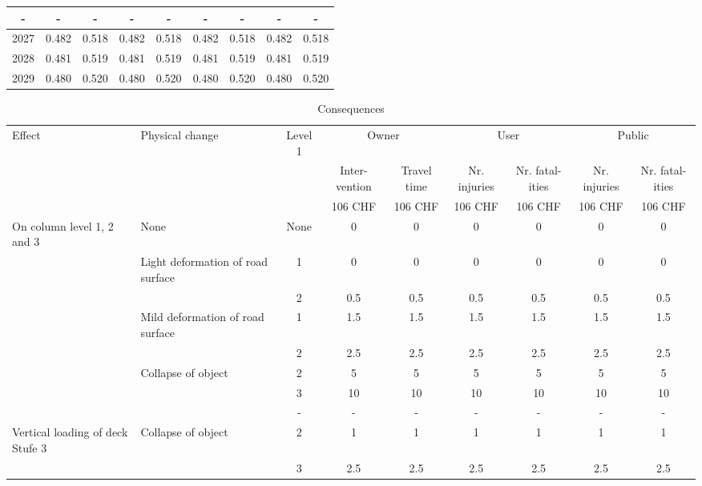 \begin{table}
\begin{tabular}{|l|l|l|l|l|l|l|l|l|}
\multicolumn{1}{|c}{-} & \multicolumn{1}{c}{-} & \multicolumn{1}{c}{-} & \multicolumn{1}{c}{-} & \multicolumn{1}{c}{-} & \multicolumn{1}{c}{-} & \multicolumn{1}{c}{-} & \multicolumn{1}{c}{-} & \multicolumn{1}{c|}{-} \\ 
\hline
\multicolumn{1}{|c|}{2027} & \multicolumn{1}{c|}{0.482} & \multicolumn{1}{c|}{0.518} & \multicolumn{1}{c|}{0.482} & \multicolumn{1}{c|}{0.518} & \multicolumn{1}{c|}{0.482} & \multicolumn{1}{c|}{0.518} & \multicolumn{1}{c|}{0.482} & \multicolumn{1}{c|}{0.518} \\ 
\hline
\multicolumn{1}{|c|}{2028} & \multicolumn{1}{c|}{0.481} & \multicolumn{1}{c|}{0.519} & \multicolumn{1}{c|}{0.481} & \multicolumn{1}{c|}{0.519} & \multicolumn{1}{c|}{0.481} & \multicolumn{1}{c|}{0.519} & \multicolumn{1}{c|}{0.481} & \multicolumn{1}{c|}{0.519} \\ 
\hline
\multicolumn{1}{|c|}{2029} & \multicolumn{1}{c|}{0.480} & \multicolumn{1}{c|}{0.520} & \multicolumn{1}{c|}{0.480} & \multicolumn{1}{c|}{0.520} & \multicolumn{1}{c|}{0.480} & \multicolumn{1}{c|}{0.520} & \multicolumn{1}{c|}{0.480} & \multicolumn{1}{c|}{0.520} \\ 
\hline
\end{tabular}
\end{table}

\begin{table}
	\centering
	\caption{Consequences} \label{tbleventfault:7}
\begin{tabular}{|p{2cm}|p{2.5cm}|c|c|c|c|c|c|c|}
\hline
Effect & Physical change & Level 1 & \multicolumn{2}{c|}{Owner} & \multicolumn{2}{c|}{User} & \multicolumn{2}{c|}{Public} \\ 
\cline{4-9}
 &  &  & Inter-vention & Travel time & Nr. injuries & Nr. fatal-ities & Nr. injuries & Nr. fatal-ities \\ 
\cline{4-9}
 &  &  & 106 CHF & 106 CHF & 106 CHF & 106 CHF & 106 CHF & 106 CHF \\ 
\hline
On column level 1, 2 and 3 & None & None & 0 & 0 & 0 & 0 & 0 & 0 \\ 
\cline{2-9}
 & Light deformation  of road surface & 1 & 0 & 0 & 0 & 0 & 0 & 0 \\ 
\cline{3-9}
 &  & 2 & 0.5 & 0.5 & 0.5 & 0.5 & 0.5 & 0.5 \\ 
\cline{2-9}
 & Mild deformation of road surface & 1 & 1.5 & 1.5 & 1.5 & 1.5 & 1.5 & 1.5 \\ 
\cline{3-9}
 &  & 2 & 2.5 & 2.5 & 2.5 & 2.5 & 2.5 & 2.5 \\ 
\cline{2-9}
 & Collapse of object & 2 & 5 & 5 & 5 & 5 & 5 & 5 \\ 
\cline{3-9}
 &  & 3 & 10 & 10 & 10 & 10 & 10 & 10 \\ 
\hline
 &  & - & - & - & - & - & - & - \\ 
\hline
Vertical loading of deck Stufe 3 & Collapse of object & 2 & 1 & 1 & 1 & 1 & 1 & 1 \\ 
\cline{3-9}
 &  & 3 & 2.5 & 2.5 & 2.5 & 2.5 & 2.5 & 2.5 \\ 
\hline
\end{tabular}
\end{table}
